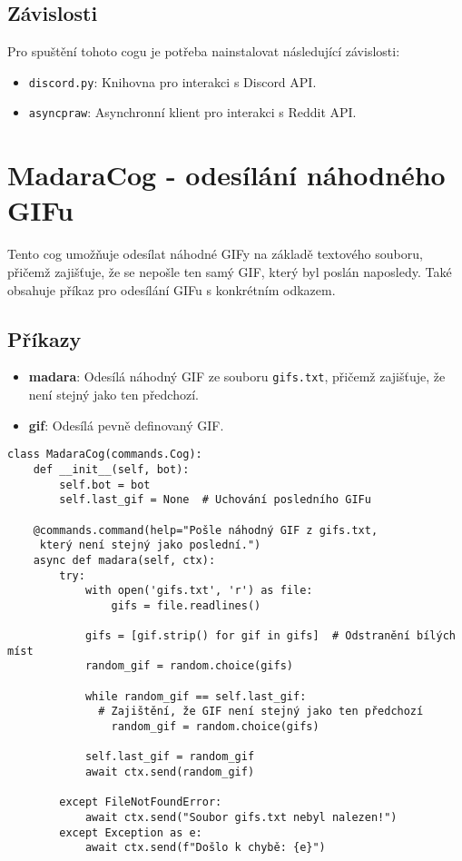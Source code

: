 \documentclass[12pt, a4paper]{report}
\begin{document}
\subsection{Závislosti}

Pro spuštění tohoto cogu je potřeba nainstalovat následující závislosti:

\begin{itemize}
    \item \texttt{discord.py}: Knihovna pro interakci s Discord API.
    \item \texttt{asyncpraw}: Asynchronní klient pro interakci s Reddit API. \newline
\end{itemize}


\section{MadaraCog - odesílání náhodného GIFu}

Tento cog umožňuje odesílat náhodné GIFy na základě textového souboru, přičemž zajišťuje, že se nepošle ten samý GIF, který byl poslán naposledy. Také obsahuje příkaz pro odesílání GIFu s konkrétním odkazem.

\subsection{Příkazy}

\begin{itemize}
    \item \textbf{madara}: Odesílá náhodný GIF ze souboru \texttt{gifs.txt}, přičemž zajišťuje, že není stejný jako ten předchozí.
    \item \textbf{gif}: Odesílá pevně definovaný GIF.
\end{itemize}

\begin{lstlisting}[style=Python, caption=Implementace náhodného odesílání GIFu]
    class MadaraCog(commands.Cog):
    def __init__(self, bot):
        self.bot = bot
        self.last_gif = None  # Uchování posledního GIFu

    @commands.command(help="Pošle náhodný GIF z gifs.txt,
     který není stejný jako poslední.")
    async def madara(self, ctx):
        try:
            with open('gifs.txt', 'r') as file:
                gifs = file.readlines()

            gifs = [gif.strip() for gif in gifs]  # Odstranění bílých míst
            random_gif = random.choice(gifs)
            
            while random_gif == self.last_gif:
              # Zajištění, že GIF není stejný jako ten předchozí
                random_gif = random.choice(gifs)

            self.last_gif = random_gif
            await ctx.send(random_gif)

        except FileNotFoundError:
            await ctx.send("Soubor gifs.txt nebyl nalezen!")
        except Exception as e:
            await ctx.send(f"Došlo k chybě: {e}")
\end{lstlisting}
\end{document}
